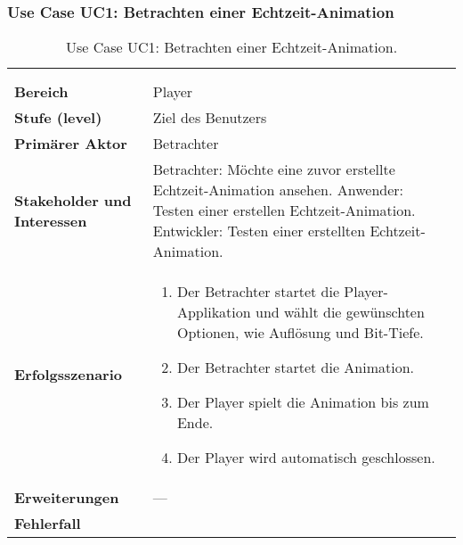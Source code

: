 
\subsubsection{Use Case UC1: Betrachten einer Echtzeit-Animation}
\label{ssubsec:requirements:use-cases:uc1}

\begin{longtabu}{p{0.3\textwidth}p{0.7\textwidth}}
    \centering\\
    \caption{Use Case UC1: Betrachten einer
        Echtzeit-Animation.}\label{table:uc1-watch-demo}\\
    \toprule
        \textbf{Bereich} &
        Player\\
    \cmidrule(r){1-1}\cmidrule(lr){2-2}
        \textbf{Stufe (level)} &
        Ziel des Benutzers \\
    \cmidrule(r){1-1}\cmidrule(lr){2-2}
        \textbf{Primärer Aktor} &
        Betrachter \\
    \cmidrule(r){1-1}\cmidrule(lr){2-2}
        \textbf{Stakeholder und Interessen} &
        Betrachter: Möchte eine zuvor erstellte Echtzeit-Animation ansehen.  \newline
        Anwender: Testen einer erstellen Echtzeit-Animation. \newline
        Entwickler: Testen einer erstellten Echtzeit-Animation. \\
    \cmidrule(r){1-1}\cmidrule(lr){2-2}
        \textbf{Erfolgsszenario} &
        \begin{enumerate}
            \item{Der Betrachter startet die Player-Applikation und wählt
                    die gewünschten Optionen, wie Auflösung und Bit-Tiefe.}
            \item{Der Betrachter startet die Animation.}
            \item{Der Player spielt die Animation bis zum Ende.}
            \item{Der Player wird automatisch geschlossen.}
        \end{enumerate} \\
    \cmidrule(r){1-1}\cmidrule(lr){2-2}
        \textbf{Erweiterungen} &
        ---\\
    \cmidrule(r){1-1}\cmidrule(lr){2-2}
        \textbf{Fehlerfall} &
        \begin{enumerate}[label= (\alph*)]

\end{enumerate}
\end{longtabu}
